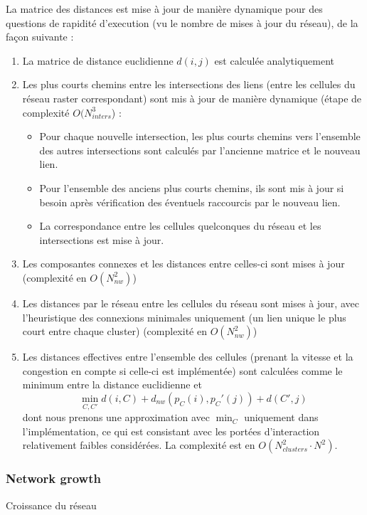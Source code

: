 {\begin{enumerate}
\end{enumerate}
}{
La matrice des distances est mise à jour de manière dynamique pour des questions de rapidité d'execution (vu le nombre de mises à jour du réseau), de la façon suivante :
\begin{enumerate}
	\item La matrice de distance euclidienne $d(i,j)$ est calculée analytiquement
	\item Les plus courts chemins entre les intersections des liens (entre les cellules du réseau raster correspondant) sont mis à jour de manière dynamique (étape de complexité $O(N_{inters}^3$) :
	\begin{itemize}
		\item Pour chaque nouvelle intersection, les plus courts chemins vers l'ensemble des autres intersections sont calculés par l'ancienne matrice et le nouveau lien.
		\item Pour l'ensemble des anciens plus courts chemins, ils sont mis à jour si besoin après vérification des éventuels raccourcis par le nouveau lien.
		\item La correspondance entre les cellules quelconques du réseau et les intersections est mise à jour.
	\end{itemize}
	\item Les composantes connexes et les distances entre celles-ci sont mises à jour (complexité en $O(N_{nw}^2)$)
	\item Les distances par le réseau entre les cellules du réseau sont mises à jour, avec l'heuristique des connexions minimales uniquement (un lien unique le plus court entre chaque cluster) (complexité en $O(N_{nw}^2)$)
	\item Les distances effectives entre l'ensemble des cellules (prenant la vitesse et la congestion en compte si celle-ci est implémentée) sont calculées comme le minimum entre la distance euclidienne et 
	\[\min_{C,C'}{d(i,C)+d_{nw}(p_C(i),p_C'(j))+d(C',j)}\]
	dont nous prenons une approximation avec $\min_C$ uniquement dans l'implémentation, ce qui est consistant avec les portées d'interaction relativement faibles considérées. La complexité est en $O(N_{clusters}^2\cdot N^2)$.
\end{enumerate}
}


\subsubsection{Network growth}{Croissance du réseau}



